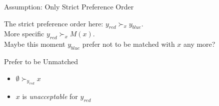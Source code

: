 \documentclass{beamer}
\begin{document}
\begin{frame}{Assumption: Only Strict Preference Order}
	\pause
	\begin{figure}
	\end{figure}
	\pause
	\begin{center}
		The strict preference order here: $y_{red} \succ_{x} y_{blue}$. \\ More specific $y_{red} \succ_{x} M(x)$.\\ 
		\pause
		Maybe this moment $y_{blue}$ prefer not to be matched with $x$ any more?
	\end{center}
\end{frame}



\begin{frame}{Prefer to be Unmatched}
	\begin{itemize}
		\item $\emptyset \succ_{y_{red}} x$ 
		\item $x$ is \emph{unacceptable} for $y_{red}$
	\end{itemize}
\end{frame}
\end{document}
